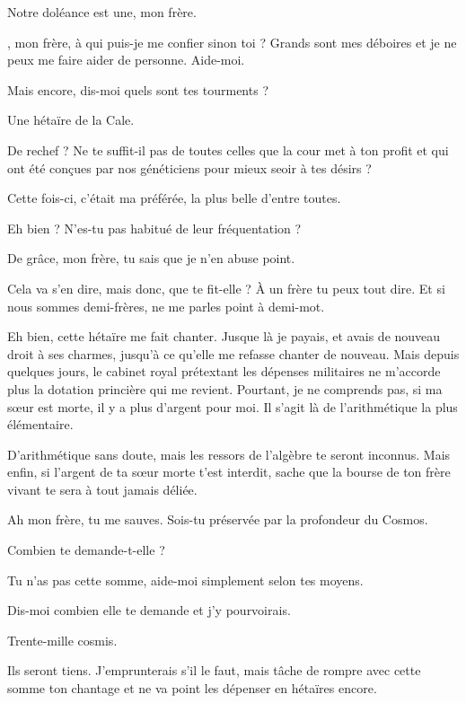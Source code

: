 \begin{drama}
  \elenaspeaks Notre doléance est une, mon frère.

  \vladimirspeaks \elena, mon frère, à qui puis-je me confier sinon toi ? Grands sont mes déboires et je ne peux me faire aider de personne. Aide-moi.

  \elenaspeaks Mais encore, dis-moi quels sont tes tourments ?

  \vladimirspeaks Une hétaïre de la Cale.

  \elenaspeaks De rechef ? Ne te suffit-il pas de toutes celles que la cour met à ton profit et qui ont été conçues par nos généticiens pour mieux seoir à tes désirs ?

  \vladimirspeaks Cette fois-ci, c’était ma préférée, la plus belle d’entre toutes.

  \elenaspeaks Eh bien ? N’es-tu pas habitué de leur fréquentation ?

  \vladimirspeaks De grâce, mon frère, tu sais que je n’en abuse point.

  \elenaspeaks Cela va s’en dire, mais donc, que te fit-elle ? À un frère tu peux tout dire. Et si nous sommes demi-frères, ne me parles point à demi-mot.

  \vladimirspeaks Eh bien, cette hétaïre me fait chanter. Jusque là je payais, et avais de nouveau droit à ses charmes, jusqu’à ce qu’elle me refasse chanter de nouveau. Mais depuis quelques jours, le cabinet royal prétextant les dépenses militaires ne m’accorde plus la dotation princière qui me revient. Pourtant, je ne comprends pas, si ma sœur est morte, il y a plus d’argent pour moi. Il s’agit là de l’arithmétique la plus élémentaire.

  \elenaspeaks D’arithmétique sans doute, mais les ressors de l’algèbre te seront inconnus. Mais enfin, si l’argent de ta sœur morte t’est interdit, sache que la bourse de ton frère vivant te sera à tout jamais déliée.

  \vladimirspeaks Ah mon frère, tu me sauves. Sois-tu préservée par la profondeur du Cosmos.

  \elenaspeaks Combien te demande-t-elle ?

  \vladimirspeaks Tu n’as pas cette somme, aide-moi simplement selon tes moyens.

  \elenaspeaks Dis-moi combien elle te demande et j’y pourvoirais.

  \vladimirspeaks Trente-mille cosmis.

  \elenaspeaks Ils seront tiens. J’emprunterais s’il le faut, mais tâche de rompre avec cette somme ton chantage et ne va point les dépenser en hétaïres encore.
\end{drama}

